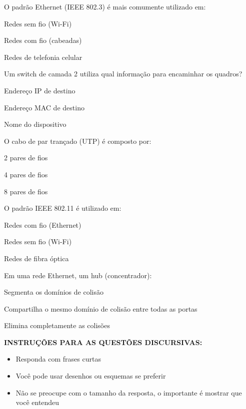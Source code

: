 \documentclass[12pt]{modelo/prova2}
\begin{document}
\question[0.5] O padrão Ethernet (IEEE 802.3) é mais comumente utilizado em:
\begin{choices}
\item Redes sem fio (Wi-Fi)
\item Redes com fio (cabeadas)
\item Redes de telefonia celular
\end{choices}


\question[0.5] Um switch de camada 2 utiliza qual informação para encaminhar os quadros?
\begin{choices}
\item Endereço IP de destino
\item Endereço MAC de destino
\item Nome do dispositivo
\end{choices}


\question[0.5] O cabo de par trançado (UTP) é composto por:
\begin{choices}
\item 2 pares de fios
\item 4 pares de fios
\item 8 pares de fios
\end{choices}

\question[0.5] O padrão IEEE 802.11 é utilizado em:
\begin{choices}
\item Redes com fio (Ethernet)
\item Redes sem fio (Wi-Fi)
\item Redes de fibra óptica
\end{choices}


\question[0.5] Em uma rede Ethernet, um hub (concentrador):
\begin{choices}
\item Segmenta os domínios de colisão
\item Compartilha o mesmo domínio de colisão entre todas as portas
\item Elimina completamente as colisões
\end{choices}

\noindent\textbf{INSTRUÇÕES PARA AS QUESTÕES DISCURSIVAS:}
\begin{itemize}
\item Responda com frases curtas
\item Você pode usar desenhos ou esquemas se preferir
\item Não se preocupe com o tamanho da resposta, o importante é mostrar que você entendeu
\end{itemize}
\end{document}
